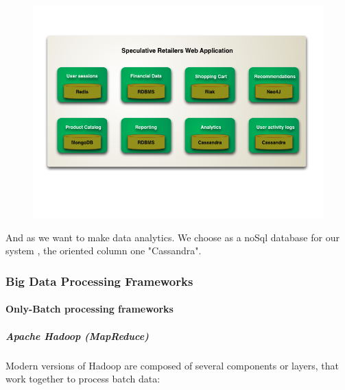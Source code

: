 \begin{figure}[h!]
	\centering
	\includegraphics[height=0.3\textheight]{fig01/Polyglot}
	\label{fig:FilialesEtClients}
\end{figure}

And as we want to make data analytics. We choose as a noSql database for our system , the oriented column one "Cassandra". 

\subsubsection{Big Data Processing Frameworks}
\label{sec:sec01}
\paragraph{Only-Batch processing frameworks }
\label{sec:sec01}
\subparagraph{Apache Hadoop (MapReduce) }
\label{sec:sec01}
Modern versions of Hadoop are composed of several components or layers, that work together to process batch data:

